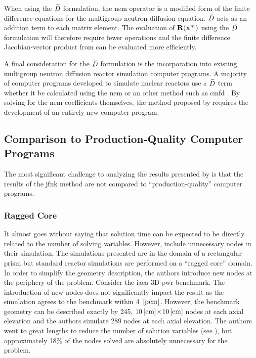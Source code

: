     When using the $\widetilde{D}$ formulation, the \gls{nem} operator is a modified
    form of the finite difference equations for the multigroup neutron diffusion
    equation. $\widetilde{D}$ acts as an addition term to each matrix element. The
    evaluation of $\mathbf{R}(\mathbf{x}^m)$ using the $\widetilde{D}$ formulation will
    therefore require fewer operations and the finite difference Jacobian-vector
    product from  can be evaluated more efficiently.
    
    A final consideration for the $\widetilde{D}$ formulation is the incorporation
    into existing multigroup neutron diffusion reactor simulation computer
    programs. A majority of computer programs developed to simulate nuclear
    reactors use a $\widetilde{D}$ term whether it be calculated using the \gls{nem}
    or an other method such as \gls{cmfd} \cite{casmo4,simulate3,mpact}. By
    solving for the \gls{nem} coefficients themselves, the method proposed by
    \citeauthor{qe2paper} requires the development of an entirely new computer
    program.

  \subsection{Comparison to Production-Quality Computer Programs}

    The most significant challenge to analyzing the results presented by
    \citeauthor{qe2paper} is that the results of the \gls{jfnk} method are not
    compared to ``production-quality'' computer programs. 
    
    \subsubsection{Ragged Core}

      It almost goes without saying that solution time can be expected to be
      directly related to the number of solving variables. However,
      \citeauthor{qe2paper} include unnecessary nodes in their simulation. The
      simulations presented are in the domain of a rectangular prism but
      standard reactor simulations are performed on a ``ragged core'' domain. In
      order to simplify the geometry description, the authors introduce new
      nodes at the periphery of the problem. Consider the \gls{iaea} 3D
      \gls{pwr} benchmark. The introduction of new nodes does not significantly
      impact the result as the simulation agrees to the benchmark within
      $4~\left[\text{{pcm}}\right]$. However, the benchmark geometry can be described exactly
      by 245, $10\left[\text{{cm}}\right] \! \times \! 10\left[\text{{cm}}\right]$ nodes at each axial
      elevation and the authors simulate 289 nodes at each axial elevation. The
      authors went to great lengths to reduce the number of solution variables
      (see ), but approximately 18\% of the nodes
      solved are absolutely unnecessary for the problem.

